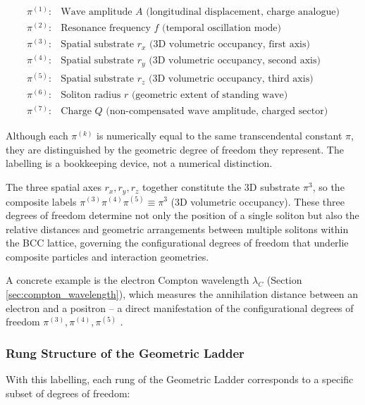 \documentclass[10pt,a4paper]{article}
\begin{document}
\begin{equation}
	\label{eq:dof_assignment}
	\begin{array}{ll}
		\pi^{(1)}: & \text{Wave amplitude } A \text{ 
			(longitudinal displacement, charge analogue)} \\
		\pi^{(2)}: & \text{Resonance frequency } f 
		\text{ (temporal oscillation mode)} \\
		\pi^{(3)}: & \text{Spatial substrate } r_x 
		\text{ (3D volumetric occupancy, first axis)} \\
		\pi^{(4)}: & \text{Spatial substrate } r_y 
		\text{ (3D volumetric occupancy, second axis)} \\
		\pi^{(5)}: & \text{Spatial substrate } r_z 
		\text{ (3D volumetric occupancy, third axis)} \\
		\pi^{(6)}: & \text{Soliton radius } r 
		\text{ (geometric extent of standing wave)} \\
		\pi^{(7)}: & \text{Charge } Q 
		\text{ (non-compensated wave amplitude, charged sector)}
	\end{array}
\end{equation}

\noindent Although each $\pi^{(k)}$ is numerically equal to the same 
transcendental constant $\pi$, they are distinguished by the geometric 
degree of freedom they represent. The labelling is a bookkeeping device, 
not a numerical distinction.

The three spatial axes $r_x, r_y, r_z$ together constitute the 3D substrate 
$\pi^3$, so the composite labels $\pi^{(3)}\pi^{(4)}\pi^{(5)} \equiv \pi^3$ 
(3D volumetric occupancy). These three degrees of freedom 
determine not only the position of a single soliton but also the relative 
distances and geometric arrangements between multiple solitons within the 
BCC lattice, governing the configurational degrees of freedom that underlie 
composite particles and interaction geometries. 

A concrete example is the electron Compton wavelength $\lambda_C$ (Section \ref{sec:compton_wavelength}), which measures the annihilation distance between an electron and a positron – a direct manifestation of the configurational degrees of freedom $\pi^{(3)},\pi^{(4)},\pi^{(5)}$ .

\subsubsection*{Rung Structure of the Geometric Ladder}

With this labelling, each rung of the Geometric Ladder corresponds to a 
specific subset of degrees of freedom:
\end{document}
